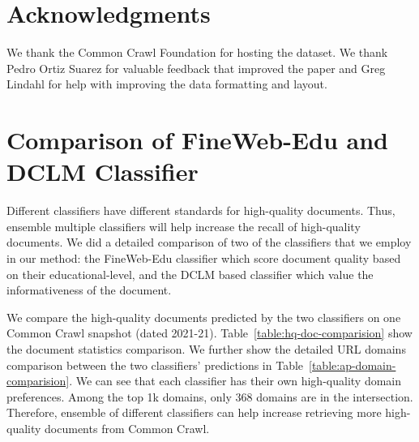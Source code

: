 \documentclass[11pt]{article}
\begin{document}
\section*{Acknowledgments}
We thank the Common Crawl Foundation for hosting the dataset. We thank Pedro Ortiz Suarez for valuable feedback that improved the paper and Greg Lindahl for help with improving the data formatting and layout.



\newpage

\appendix

\section{Comparison of FineWeb-Edu and DCLM Classifier}
\label{sec:appendix-1}
Different classifiers have different standards for high-quality documents. Thus, ensemble multiple classifiers will help increase the recall of high-quality documents. We did a detailed comparison of two of the classifiers that we employ in our method: the FineWeb-Edu classifier which score document quality based on their educational-level, and the DCLM based classifier which value the informativeness of the document. 

We compare the high-quality documents predicted by the two classifiers on one Common Crawl snapshot (dated 2021-21). Table~\ref{table:hq-doc-comparision} show the document statistics comparison. We further show the detailed URL domains comparison between the two classifiers' predictions in Table~\ref{table:ap-domain-comparision}. We can see that each classifier has their own high-quality domain preferences. Among the top 1k domains, only 368 domains are in the intersection. Therefore, ensemble of different classifiers can help increase retrieving more high-quality documents from Common Crawl.
\end{document}
